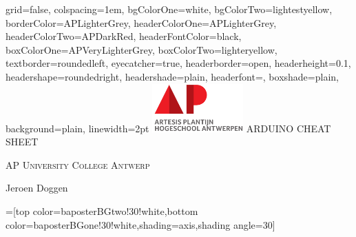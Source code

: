 \documentclass[landscape,final,a0paper]{baposter}
\begin{document}
\newlength{\leftimgwidth}
\begin{poster}%
  {
  grid=false,
  colspacing=1em,
  bgColorOne=white,
  bgColorTwo=lightestyellow,
  borderColor=APLighterGrey,
  headerColorOne=APLighterGrey,
  headerColorTwo=APDarkRed,
  headerFontColor=black,
  boxColorOne=APVeryLighterGrey,
  boxColorTwo=lighteryellow,
  textborder=roundedleft,
  eyecatcher=true,
  headerborder=open,
  headerheight=0.1\textheight,
  headershape=roundedright,
  headershade=plain,
  headerfont=\LARGE\textsf, %
  boxshade=plain,
  background=plain,
  linewidth=2pt
  }
  {
  \includegraphics[height=5em]{AP.png}
  } %
  {\sf %
  ARDUINO CHEAT SHEET}
  {\sf %
  \vspace{0.05em}
  \textsc{AP University College Antwerp}

  Jeroen Doggen
  }
  {%
  }

  =[top color=baposterBGtwo!30!white,bottom color=baposterBGone!30!white,shading=axis,shading angle=30]

     \setlength{\leftimgwidth}{0.78em+8.0em}


\end{poster}
\end{document}
